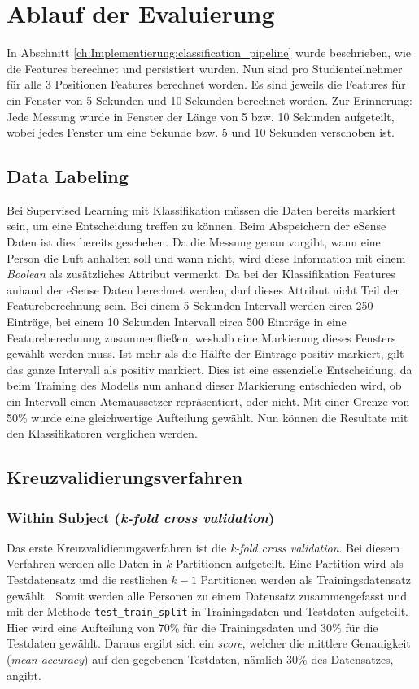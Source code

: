 \section{Ablauf der Evaluierung}
In Abschnitt \ref{ch:Implementierung:classification_pipeline} wurde beschrieben, wie die Features berechnet und persistiert wurden. 
Nun sind pro Studienteilnehmer für alle 3 Positionen Features berechnet worden. 
Es sind jeweils die Features für ein Fenster von 5 Sekunden und 10 Sekunden berechnet worden.
Zur Erinnerung: Jede Messung wurde in Fenster der Länge von 5 bzw. 10 Sekunden aufgeteilt, wobei jedes Fenster um eine Sekunde bzw. 5 und 10 Sekunden verschoben ist.

\subsection{Data Labeling}
Bei Supervised Learning mit Klassifikation müssen die Daten bereits markiert sein, um eine Entscheidung treffen zu können. 
Beim Abspeichern der eSense Daten ist dies bereits geschehen.
Da die Messung genau vorgibt, wann eine Person die Luft anhalten soll und wann nicht, wird diese Information mit einem \textit{Boolean} als zusätzliches Attribut vermerkt.
Da bei der Klassifikation Features anhand der eSense Daten berechnet werden, darf dieses Attribut nicht Teil der Featureberechnung sein.
Bei einem 5 Sekunden Intervall werden circa 250 Einträge, bei einem 10 Sekunden Intervall circa 500 Einträge in eine Featureberechnung zusammenfließen, weshalb eine Markierung dieses Fensters gewählt werden muss.
Ist mehr als die Hälfte der Einträge positiv markiert, gilt das ganze Intervall als positiv markiert.
Dies ist eine essenzielle Entscheidung, da beim Training des Modells nun anhand dieser Markierung entschieden wird, ob ein Intervall einen Atemaussetzer repräsentiert, oder nicht.
Mit einer Grenze von 50\% wurde eine gleichwertige Aufteilung gewählt.
Nun können die Resultate mit den Klassifikatoren verglichen werden.

\subsection{Kreuzvalidierungsverfahren}
\subsubsection{Within Subject (\textit{k-fold cross validation})}
Das erste Kreuzvalidierungsverfahren ist die \textit{k-fold cross validation}.
Bei diesem Verfahren werden alle Daten in $k$ Partitionen aufgeteilt.
Eine Partition wird als Testdatensatz und die restlichen $k-1$ Partitionen werden als Trainingsdatensatz gewählt \cite{neumannMaschineLearningKIT2020}.
Somit werden alle Personen zu einem Datensatz zusammengefasst und mit der Methode \texttt{test\_train\_split} in Trainingsdaten und Testdaten aufgeteilt.
Hier wird eine Aufteilung von 70\% für die Trainingsdaten und 30\% für die Testdaten gewählt. 
Daraus ergibt sich ein \textit{score}, welcher die mittlere Genauigkeit (\textit{mean accuracy}) auf den gegebenen Testdaten, nämlich 30\% des Datensatzes, angibt.

